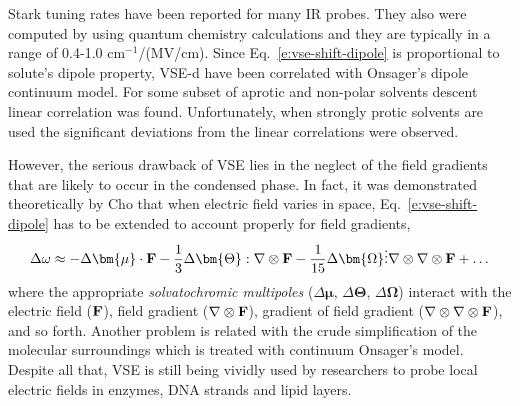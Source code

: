 \documentclass[b5paper,oneside,fleqn,11pt]{book}
\newcommand{\BM}[1]{\bm{#1}}
\begin{document}
\begin{refsection}
\begin{equation}
\end{equation}
%
Stark tuning rates have been reported for many IR probes. \citep{Suydam.Boxer.Biochem.2003,Levinson.Fried.Boxer.JPCB.2012}
They also were computed by using quantum chemistry calculations \citep{Dalosto.Vanderkooi.Sharp.JPCB.2004,
Andrews.Boxer.JPCA.2002,Andrews.Boxer.JPCA.2000}
and they are typically in a range of 0.4-1.0 cm$^{-1}$/(MV/cm). 
Since Eq.~\eqref{e:vse-shift-dipole} is proportional to solute's
dipole property, VSE-d have been correlated with Onsager's dipole
continuum model. For some subset of aprotic and non-polar
solvents descent linear correlation was found. \citep{Levinson.Fried.Boxer.JPCB.2012} 
Unfortunately,
when strongly protic solvents are used the significant deviations
from the linear correlations were observed. \citep{Fafarman.Sigala.Herschlag.Boxer.JACS.2010,Bagchi.Fried.Boxer.JACS.2012}

However, the serious drawback of VSE lies in the neglect of the field gradients that are 
likely to occur in the condensed phase. In fact, it was demonstrated theoretically
by Cho \citep{Cho.JCP.2009,Lee.Choi.Cho.JCP.2012} 
that when electric field varies in space, Eq.~\eqref{e:vse-shift-dipole}
has to be extended to account properly for field gradients,
%
\begin{equation} \label{e:vse-shift-multipoles}
 \Delta \omega 
\approx 
             - \Delta {\BM \mu}    \cdot                                {\bf F} 
- \frac{1}{3}  \Delta {\BM \Theta} :                     \nabla \otimes {\bf F}
- \frac{1}{15} \Delta {\BM \Omega} \vdots \nabla \otimes \nabla \otimes {\bf F}
+ \ldots
\end{equation}
%
where the appropriate \emph{solvatochromic multipoles} 
($\Delta {\BM \mu}$, $\Delta {\BM \Theta}$, $\Delta {\BM \Omega}$)
interact with the electric field (${\bf F}$), 
field gradient ($\nabla \otimes {\bf F}$), gradient of field gradient 
($\nabla \otimes \nabla \otimes {\bf F}$),
and so forth.
Another problem is related with the crude simplification of the 
molecular surroundings which is treated with continuum Onsager's model.
Despite all that, VSE is still being vividly
used by researchers to probe local electric fields in enzymes, DNA strands and 
lipid layers. 


\end{refsection}
\end{document}
